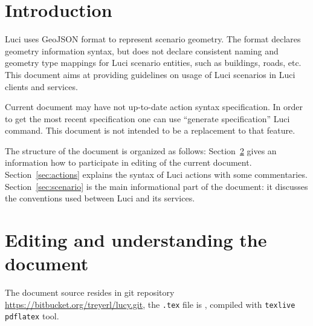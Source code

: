 \documentclass[pdftex,11pt,a4paper]{article} %
\author{\sAuthors}
\title{\sTitle}
\begin{document}
\maketitle


\section{Introduction}

\ac{Luci} uses GeoJSON format to represent scenario geometry.
The format declares geometry information syntax, but does not declare consistent naming and geometry type mappings for \ac{Luci} scenario entities, such as buildings, roads, etc.
This document aims at providing guidelines on usage of \ac{Luci} scenarios in \ac{Luci} clients and services.

Current document may have not up-to-date action syntax specification.
In order to get the most recent specification one can use ``generate specification'' \ac{Luci} command.
This document is not intended to be a replacement to that feature.

The structure of the document is organized as follows:
Section~\ref{sec:editing} gives an information how to participate in editing of the current document.
Section~\ref{sec:actions} explains the syntax of \ac{Luci} actions with some commentaries.
Section~\ref{sec:scenario} is the main informational part of the document: it discusses the conventions used between \ac{Luci} and its services.

\section{Editing and understanding the document}
\label{sec:editing}

The document source resides in git repository \url{https://bitbucket.org/treyerl/lucy.git},
the \texttt{.tex} file is , compiled with \texttt{texlive} \texttt{pdflatex} tool.
\end{document}
